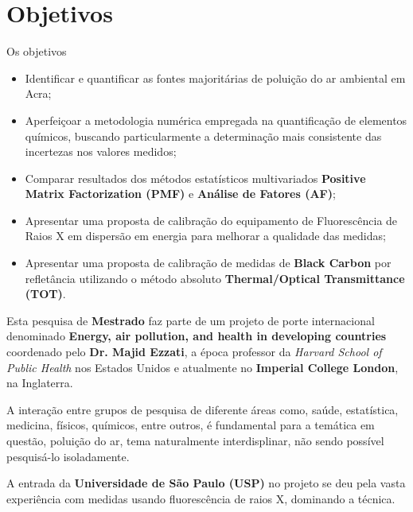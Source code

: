 \section{Objetivos}

Os objetivos 

\begin{itemize}
  \item Identificar e quantificar as fontes majoritárias de poluição do ar ambiental em Acra;
  \item Aperfeiçoar a metodologia numérica empregada na quantificação de elementos químicos, 
        buscando particularmente a determinação mais consistente das incertezas nos valores medidos;
  \item Comparar resultados dos métodos estatísticos multivariados
        \textbf{Positive Matrix Factorization (PMF)} e \textbf{Análise de Fatores (AF)};
  \item Apresentar uma proposta de calibração do equipamento de Fluorescência de Raios X
        em dispersão em energia para melhorar a qualidade das medidas;
  \item Apresentar uma proposta de calibração de medidas de \textbf{Black Carbon} por refletância
        utilizando o método absoluto \textbf{Thermal/Optical Transmittance (TOT)}.
\end{itemize}


Esta pesquisa de \textbf{Mestrado} faz parte de um projeto de porte 
internacional denominado \textbf{Energy, air pollution, and health 
in developing countries} coordenado pelo \textbf{Dr. Majid Ezzati}, 
a época professor da \textit{Harvard School of Public Health} nos 
Estados Unidos e atualmente no \textbf{Imperial College London}, 
na Inglaterra.  

A interação entre grupos de pesquisa de diferente áreas como, saúde, 
estatística, medicina, físicos, químicos, entre outros, é fundamental
para a temática em questão, poluição do ar, tema naturalmente 
interdisplinar, não sendo possível pesquisá-lo isoladamente. 

A entrada da \textbf{Universidade de São Paulo (USP)} no projeto se deu pela
vasta experiência com medidas usando fluorescência de raios X, dominando a técnica.

